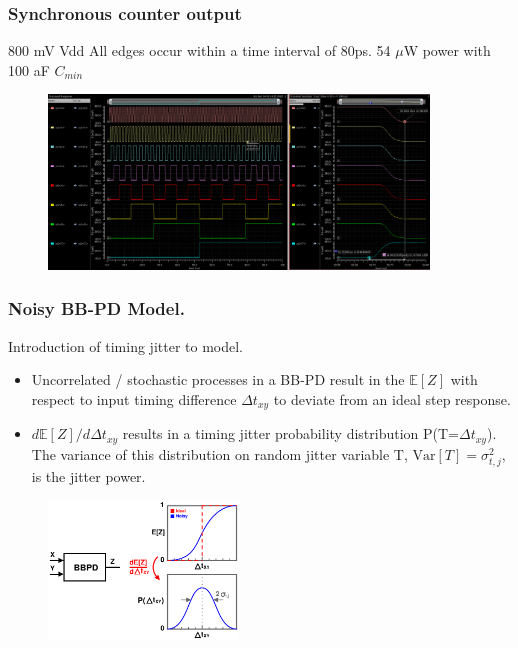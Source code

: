 \documentclass[t, screen, aspectratio=43]{beamer}
\begin{document}
\begin{frame}
	\frametitle{Synchronous counter output}
	\begin{block}{800 mV Vdd}
	\tiny
	All edges occur within a time interval of 80ps. 54 $\mu$W power with 100 aF $C_{min}$
	\begin{figure}[htb!]

	        \center\includegraphics[width=0.9\textwidth, angle=0]{sync_counter_timing.png}
	\end{figure}
	\end{block}	
\end{frame}

\begin{frame}
	\frametitle{Noisy BB-PD Model.}
	\begin{block}{Introduction of timing jitter to model.}
	\tiny
	\begin{itemize}[itemsep=4pt,label=\protect---]
		\item Uncorrelated / stochastic processes in a BB-PD result in the $\mathbb{E}[Z]$ with respect to input timing difference $\Delta t_{xy}$ to deviate from an ideal step response.
		\item $d\mathbb{E}[Z]/d\Delta t_{xy}$ results in a timing jitter probability distribution P(T=$\Delta t_{xy}$). The variance of this distribution on random jitter variable T, $\mathrm{Var}[T] = \sigma_{t,j}^2$, is the jitter power.
	\end{itemize}

	\begin{figure}[htb!]
	    \centering
		\includegraphics[width=0.45\textwidth, angle=0]{bbpd_jitter.pdf}
	\end{figure}
	\end{block}	
\end{frame}
\end{document}
